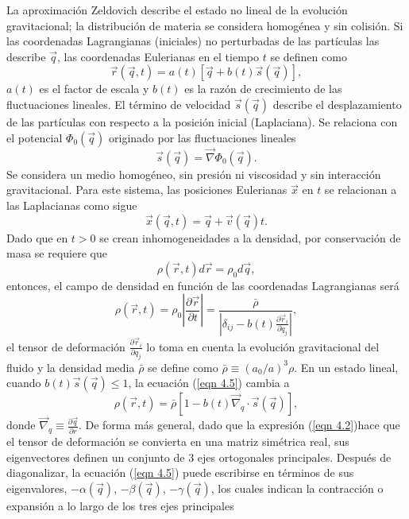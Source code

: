 \documentclass[a4paper,openright,12pt]{book}
\begin{document}
La aproximación Zeldovich describe el estado no lineal de la evolución gravitacional; la distribución de materia se considera homogénea y sin colisión. Si las coordenadas Lagrangianas (iniciales) no perturbadas de las partículas las describe $\vec{q}$, las coordenadas Eulerianas en el tiempo $t$ se definen como
\begin{equation}
\vec{r}(\vec{q}, t) = a(t)[\vec{q} + b(t)\vec{s}(\vec{q})],
\end{equation}
$a(t)$ es el factor de escala y $b(t)$ es la razón de crecimiento de las fluctuaciones lineales. El término de velocidad $\vec{s}(\vec{q})$ describe el desplazamiento de las partículas con respecto a la posición inicial (Laplaciana). Se relaciona con el potencial $\Phi_{0}(\vec{q})$ originado por las fluctuaciones lineales
\begin{equation}
\vec{s}(\vec{q}) = \vec{\nabla}\Phi_{0}(\vec{q}).\label{eqn 4.2}
\end{equation}
Se considera un medio homogéneo, sin presión ni viscosidad y sin interacción gravitacional. Para este sistema, las posiciones Eulerianas $\vec{x}$ en $t$ se relacionan a las Laplacianas como sigue
\begin{equation}
\vec{x}(\vec{q}, t) = \vec{q} + \vec{v}(\vec{q})t.\label{eqn 4.3}
\end{equation}
Dado que en $t>0$ se crean inhomogeneidades a la densidad, por conservación de masa se requiere que 
\begin{equation}
\rho(\vec{r}, t)d\vec{r} = \rho_{0}d\vec{q},\label{eqn 4.4}
\end{equation}
entonces, el campo de densidad en función de las coordenadas Lagrangianas será
\begin{equation}
\rho(\vec{r}, t) = \rho_{0} \left|\frac{\partial \vec{r}}{\partial t}\right|
=
\frac{\bar{\rho}}{\left|\delta_{ij} - b(t)\frac{\partial \vec{r}_{i}}{\partial q_{j}}\right|},\label{eqn 4.5}
\end{equation}
el tensor de deformación $\frac{\partial \vec{r}_{i}}{\partial q_{j}}$ lo toma en cuenta la evolución gravitacional del fluido y la densidad media $\bar{\rho}$ se define como $\bar{\rho}\equiv (a_{0}/a)^{3}\rho$. En un estado lineal, cuando $b(t)\vec{s}(\vec{q}) \leq 1$, la ecuación (\ref{eqn 4.5}) cambia a 
\begin{equation}
\rho(\vec{r}, t) = \bar{\rho}[1 - b(t)\vec{\nabla}_{q}\cdot\vec{s}(\vec{q})],\label{eqn 4.6}
\end{equation}
donde $\vec{\nabla}_{q} \equiv \frac{\partial\vec{q}}{\partial r}$. De forma más general, dado que la expresión (\ref{eqn 4.2})hace que el tensor de deformación se convierta en una matriz simétrica real, sus eigenvectores definen un conjunto de 3 ejes ortogonales principales. Después de diagonalizar, la ecuación (\ref{eqn 4.5}) puede escribirse en términos de sus eigenvalores, $-\alpha(\vec{q})$, $-\beta(\vec{q})$, $-\gamma(\vec{q})$, los cuales indican la contracción o expansión a lo largo de los tres ejes principales
\end{document}
